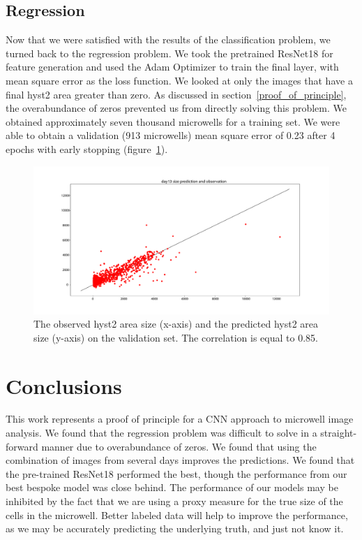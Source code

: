 \documentclass[10pt,twocolumn,letterpaper]{article}
\begin{document}
\subsection{Regression}

Now that we were satisfied with the results of the classification problem, we turned back to the regression problem.  We took the pretrained ResNet18 for feature generation and used the Adam Optimizer to train the final layer, with mean square error as the loss function.  We looked at only the images that have a final hyst2 area greater than zero.  As discussed in section~\ref{proof_of_principle}, the overabundance of zeros prevented us from directly solving this problem.  We obtained approximately seven thousand microwells for a training set.  We were able to obtain a validation (913 microwells) mean square error of 0.23 after 4 epochs with early stopping (figure~\ref{regression_correlation}).


 \begin{figure}[b!]
\begin{center}
 \includegraphics[width=0.9\linewidth]{figures/regression/size_prediction_and_observation_scatter_plot.pdf}
\end{center}
   \caption{The observed hyst2 area size (x-axis) and the predicted hyst2 area size (y-axis) on the validation set.  The correlation is equal to 0.85.}
\label{regression_correlation}
\end{figure}





\section{Conclusions}



This work represents a proof of principle for a CNN approach to microwell image analysis.  We found that the regression problem was difficult to solve in a straight-forward manner due to overabundance of zeros.  We found that using the combination of images from several days improves the predictions.  We found that the pre-trained ResNet18 performed the best, though the performance from our best bespoke model was close behind.  The performance of our models may be inhibited by the fact that we are using a proxy measure for the true size of the cells in the microwell.  Better labeled data will help to improve the performance, as we may be accurately predicting the underlying truth, and just not know it.  
\end{document}
